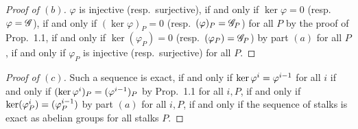 \documentclass[12pt,letterpaper]{article}
\theoremstyle{definition}
\theoremstyle{remark}
\numberwithin{equation}{section}
\numberwithin{figure}{problem}
\let\Im\relax
\DeclareMathOperator{\Im}{im}
\begin{document}
\begin{proof}[Proof of $(b)$]
  $\varphi$ is injective (resp.~surjective), if and only if $\ker\varphi = 0$ (resp.~$\Im\varphi = \mathscr{G}$), if and only if $(\ker\varphi)_P = 0$ (resp.~$(\Im\varphi)_P = \mathscr{G}_P$) for all $P$ by the proof of Prop.~1.1, if and only if $\ker(\varphi_P) = 0$ (resp.~$\Im(\varphi_P) = \mathscr{G}_P$) by part $(a)$ for all $P$, if and only if $\varphi_P$ is injective (resp.~surjective) for all $P$.
\end{proof}
\begin{proof}[Proof of $(c)$]
  Such a sequence is exact, if and only if $\ker\varphi^i = \Im\varphi^{i-1}$ for all $i$ if and only if $(\ker\varphi^i)_P = (\Im\varphi^{i-1})_P$ by Prop.~1.1 for all $i,P$, if and only if $\ker(\varphi^i_P) = \Im(\varphi^{i-1}_P)$ by part $(a)$ for all $i,P$, if and only if the sequence of stalks is exact as abelian groups for all stalks $P$.
\end{proof}
\end{document}
